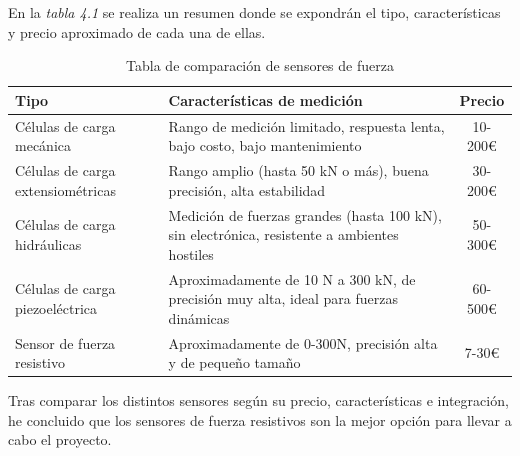 En la \textit{tabla 4.1} se realiza un resumen donde se expondrán el tipo, características y precio aproximado de cada una de ellas.
\begin{table}[]
\centering
\begin{tabular}{|l|p{8cm}|c|}
\hline
\textbf{Tipo} & \textbf{Características de medición} & \textbf{Precio} \\
\hline
Células de carga mecánica & Rango de medición limitado, respuesta lenta, bajo costo, bajo mantenimiento & 10-200€ \\
\hline
Células de carga extensiométricas & Rango amplio (hasta 50 kN o más), buena precisión, alta estabilidad & 30-200€ \\
\hline
Células de carga hidráulicas & Medición de fuerzas grandes (hasta 100 kN), sin electrónica, resistente a ambientes hostiles & 50-300€ \\
\hline
Células de carga piezoeléctrica & Aproximadamente de 10 N a 300 kN, de precisión muy alta, ideal para fuerzas dinámicas & 60-500€ \\
\hline
Sensor de fuerza resistivo & Aproximadamente de 0-300N, precisión alta y de pequeño tamaño & 7-30€ \\
\hline
\end{tabular}
\caption{Tabla de comparación de sensores de fuerza}
\label{tab:comparacion_sensores}
\end{table}

Tras comparar los distintos sensores según su precio, características e integración, he concluido que los sensores de fuerza resistivos son la mejor opción para llevar a cabo el proyecto.

